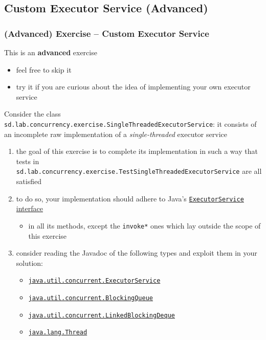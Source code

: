 \documentclass{beamer}\mode<presentation>{\usetheme{AMSCesenaPurpleAndGold}}
\begin{document}
\startExercise

\subsection{Custom Executor Service (Advanced)}

\begin{frame}[c, allowframebreaks]
	\frametitle{(Advanced) Exercise \currentExercise{} -- Custom Executor Service}
	
	\begin{alertblock}{This is an \textbf{advanced} exercise}
		\begin{itemize}
			\item feel free to skip it
			\item try it if you are curious about the idea of implementing your own executor service
		\end{itemize}
	\end{alertblock}

	\framebreak
	
	Consider the class \texttt{sd.lab.concurrency.exercise.\alert{SingleThreadedExecutorService}}: it consists of an \alert{incomplete} raw implementation of a \emph{single-threaded} executor service
	\bigskip
	\begin{enumerate}
		\item the goal of this exercise is to complete its implementation in such a way that tests in \texttt{sd.lab\allowbreak{}.concurrency\allowbreak{}.exercise\allowbreak{}.\alert{TestSingleThreadedExecutorService}}
		are all satisfied
		
		\bigskip
		
		\item to do so, your implementation should adhere to Java's \href{https://docs.oracle.com/javase/8/docs/api/java/util/concurrent/ExecutorService.html}{\texttt{ExecutorService} interface}
		\begin{itemize}
			\item in all its methods, except the \texttt{invoke*} ones which lay outside the scope of this exercise
		\end{itemize}
	
		\bigskip
		
		\item consider reading the Javadoc of the following types and exploit them in your solution:
		\begin{itemize}
			\item \href{https://docs.oracle.com/javase/8/docs/api/java/util/concurrent/ExecutorService.html}{\texttt{java.util.concurrent.ExecutorService}}
			\item \href{https://docs.oracle.com/javase/8/docs/api/java/util/concurrent/BlockingQueue.html}{\texttt{java.util.concurrent.BlockingQueue}}
			\item \href{https://docs.oracle.com/javase/8/docs/api/java/util/concurrent/LinkedBlockingDeque.html}{\texttt{java.util.concurrent.LinkedBlockingDeque}}
			\item \href{https://docs.oracle.com/javase/8/docs/api/java/lang/Thread.html}{\texttt{java.lang.Thread}}
		\end{itemize}
		

\end{enumerate}
\end{frame}
\end{document}
